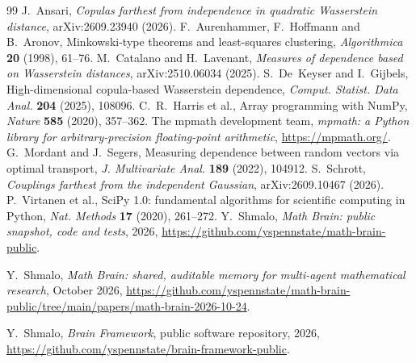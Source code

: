 \documentclass[11pt]{amsart}
\theoremstyle{definition}
\theoremstyle{remark}
\numberwithin{equation}{section}
\begin{document}
\begin{thebibliography}{99}
 J.~Ansari, \emph{Copulas farthest from independence in quadratic Wasserstein distance},
arXiv:2609.23940 (2026).
 F.~Aurenhammer, F.~Hoffmann and B.~Aronov, Minkowski-type theorems and least-squares clustering,
\emph{Algorithmica} \textbf{20} (1998), 61--76.
 M.~Catalano and H.~Lavenant, \emph{Measures of dependence based on Wasserstein distances},
arXiv:2510.06034 (2025).
 S.~De~Keyser and I.~Gijbels, High-dimensional copula-based Wasserstein dependence, \emph{Comput. Statist.
Data Anal.} \textbf{204} (2025), 108096.
 C.~R.~Harris et al., Array programming with NumPy, \emph{Nature} \textbf{585} (2020), 357--362.
 The mpmath development team, \emph{mpmath: a Python library for arbitrary-precision floating-point
arithmetic}, \url{https://mpmath.org/}.
 G.~Mordant and J.~Segers, Measuring dependence between random vectors via optimal transport, \emph{J.
Multivariate Anal.} \textbf{189} (2022), 104912.
 S.~Schrott, \emph{Couplings farthest from the independent Gaussian}, arXiv:2609.10467 (2026).
 P.~Virtanen et al., SciPy 1.0: fundamental algorithms for scientific computing in Python, \emph{Nat.
Methods} \textbf{17} (2020), 261--272.
 Y.~Shmalo, \emph{Math Brain: public snapshot, code and tests}, 2026, \url{https://github.com/yspennstate/math-brain-public}.

 Y.~Shmalo, \emph{Math Brain: shared, auditable memory for multi-agent mathematical research}, October 2026, \url{https://github.com/yspennstate/math-brain-public/tree/main/papers/math-brain-2026-10-24}.

 Y.~Shmalo, \emph{Brain Framework}, public software repository, 2026, \url{https://github.com/yspennstate/brain-framework-public}.

\end{thebibliography}
\end{document}
